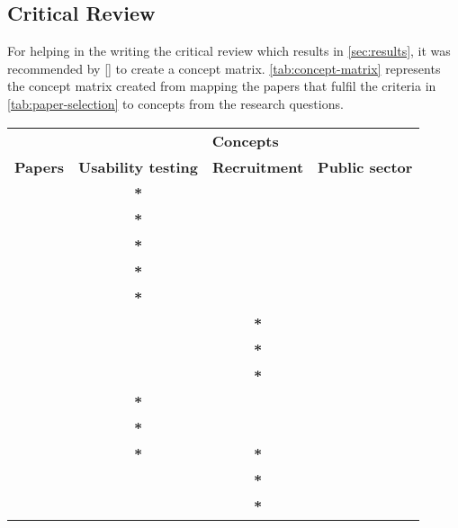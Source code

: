 \subsection{Critical Review}
For helping in the writing the critical review which results in \autoref{sec:results}, it was recommended by [\cite{bjo_2012}] to create a concept matrix. \autoref{tab:concept-matrix} represents the concept matrix created from mapping the papers that fulfil the criteria in \autoref{tab:paper-selection} to concepts from the research questions.

\begin{table}[H]
\centering
\begin{tabular}{llll}
\hline
                & \multicolumn{3}{c}{\textbf{Concepts}} \\ \cline{2-4} 
\textbf{Papers} & \textbf{Usability testing}  & \textbf{Recruitment} & \textbf{Public sector} \\ \hline
\cite{cb_2014}  & \multicolumn{1}{c}{\textbf{*}}            &            &            \\
\cite{ola_2019} & \multicolumn{1}{c}{\textbf{*}}            &            &            \\
\cite{pgd_2020} & \multicolumn{1}{c}{\textbf{*}}            &            &            \\
\cite{snh_2020} & \multicolumn{1}{c}{\textbf{*}}            &            &            \\
\cite{dn_2016}  & \multicolumn{1}{c}{\textbf{*}}            &            &            \\
\cite{pkf_2018} &             & \multicolumn{1}{c}{\textbf{*}}           &            \\
\cite{aj_2015}  &             & \multicolumn{1}{c}{\textbf{*}}           &            \\       
\cite{nc_2020}  &             & \multicolumn{1}{c}{\textbf{*}}           &            \\
\cite{sg_2008}  & \multicolumn{1}{c}{\textbf{*}}            &            &            \\
\cite{mh_2016}  & \multicolumn{1}{c}{\textbf{*}}            &            &            \\
\cite{gl_2007}  & \multicolumn{1}{c}{\textbf{*}}            & \multicolumn{1}{c}{\textbf{*}}            &  \\
\cite{hf_2021}  &             & \multicolumn{1}{c}{\textbf{*}}           &            \\
\cite{md_2017}  &             & \multicolumn{1}{c}{\textbf{*}}           &            \\

\end{tabular}
\end{table}
